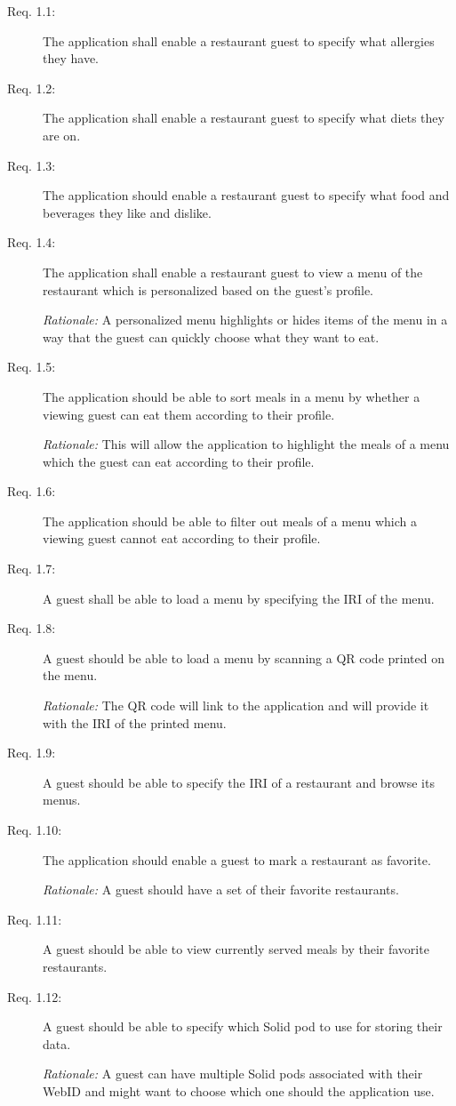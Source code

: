 \begin{description}
    \item [Req. 1.1:] The application shall enable a restaurant guest to specify what allergies they have.
    \item [Req. 1.2:] The application shall enable a restaurant guest to specify what diets they are on.
    \item [Req. 1.3:] The application should enable a restaurant guest to specify what food and beverages they like and dislike.
    \item [Req. 1.4:] The application shall enable a restaurant guest to view a menu of the restaurant which is personalized based on the guest's profile.

    \emph{Rationale:} A personalized menu highlights or hides items of the menu in a way that the guest can quickly choose what they want to eat. 
    \item [Req. 1.5:] The application should be able to sort meals in a menu by whether a viewing guest can eat them according to their profile.

    \emph{Rationale:} This will allow the application to highlight the meals of a menu which the guest can eat according to their profile.
    \item [Req. 1.6:] The application should be able to filter out meals of a menu which a viewing guest cannot eat according to their profile.
    \item [Req. 1.7:] A guest shall be able to load a menu by specifying the IRI of the menu.
    \item [Req. 1.8:] A guest should be able to load a menu by scanning a QR code printed on the menu.

    \emph{Rationale:} The QR code will link to the application and will provide it with the IRI of the printed menu.
    \item [Req. 1.9:] A guest should be able to specify the IRI of a restaurant and browse its menus.
    \item [Req. 1.10:] The application should enable a guest to mark a restaurant as favorite.
    
    \emph{Rationale:} A guest should have a set of their favorite restaurants.
    \item [Req. 1.11:] A guest should be able to view currently served meals by their favorite restaurants.
    \item [Req. 1.12:] A guest should be able to specify which Solid pod to use for storing their data.

    \emph{Rationale:} A guest can have multiple Solid pods associated with their WebID and might want to choose which one should the application use.
\end{description}

